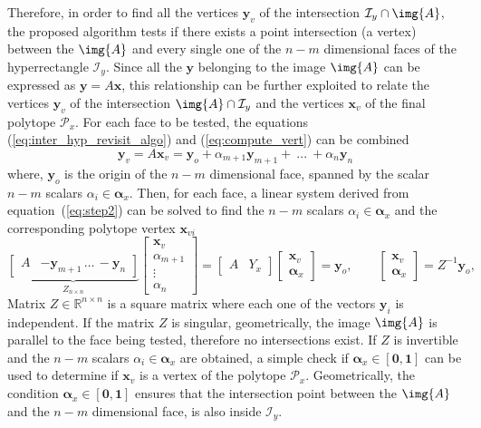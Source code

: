 Therefore, in order to find all the vertices $\bm{y}_{v}$ of the intersection $\mathcal{I}_y\cap\img{A}$, the proposed algorithm tests if there exists a point intersection (a vertex) between the $\img{A}$ and every single one of the $n-m$ dimensional faces of the hyperrectangle $\mathcal{I}_y$. Since all the $\bm{y}$ belonging to the image $\img{A}$ can be expressed as $\bm{y}=A\bm{x}$, this relationship can be further exploited to relate the vertices $\bm{y}_{v}$ of the intersection $\img{A}\cap\mathcal{I}_y$ and the vertices $\bm{x}_{v}$ of the final polytope $\mathcal{P}_x$. For each face to be tested, the equations  (\ref{eq:inter_hyp_revisit_algo}) and (\ref{eq:compute_vert}) can be combined
\begin{equation}
    \bm{y}_{v} = A \bm{x}_{v} = \bm{y}_{o} + \alpha_{m+1} \bm{y}_{m+1}+ ~...~ + \alpha_n \bm{y}_n \label{eq:step2}
\end{equation}
where, $\bm{y}_o$ is the origin of the $n\!-\!m$ dimensional face, spanned by the scalar $n\!-\!m$ scalars $\alpha_i\in\bm{\alpha}_x$.
Then, for each face, a linear system derived from equation~(\ref{eq:step2}) can be solved to find the $n\!-\!m$ scalars $\alpha_i\in\bm{\alpha}_{x}$ and the corresponding polytope vertex $\bm{x}_{vi}$
\begin{equation}
    \underbrace{\begin{bmatrix}A&-\bm{y}_{m+1} \, \dots \, -\bm{y}_{n} \end{bmatrix}}_{Z_{n\times n}} \begin{bmatrix}\bm{x}_{v}\\ \alpha_{m+1} \\ \vdots\\\alpha_{n} \end{bmatrix} =\begin{bmatrix}A &Y_{x} \end{bmatrix}\begin{bmatrix}\bm{x}_{v}\\ \bm{\alpha}_{x} \end{bmatrix}  = \bm{y}_o, \qquad \begin{bmatrix}\bm{x}_{v}\\ \bm{\alpha}_{x} \end{bmatrix} = Z^{-1}\bm{y}_o, 
    \label{eq:linear_system_full}
\end{equation}
Matrix $Z\in\mathbb{R}^{n\times n}$ is a square matrix where each one of the vectors $\bm{y}_i$ is independent. If the matrix $Z$ is singular, geometrically, the image $\img{A}$ is parallel to the face being tested, therefore no intersections exist. If $Z$ is invertible and the $n-m$ scalars $\alpha_i\in\bm{\alpha}_x$ are obtained, a simple check if $\bm{\alpha}_x \in [\bm{0},\bm{1}]$ can be used to determine if $\bm{x}_{v}$ is a vertex of the polytope $\mathcal{P}_x$. Geometrically, the condition $\bm{\alpha}_x \in [\bm{0},\bm{1}]$ ensures that the intersection point between the $\img{A}$ and the $n\!-\!m$ dimensional face, is also inside $\mathcal{I}_y$.

